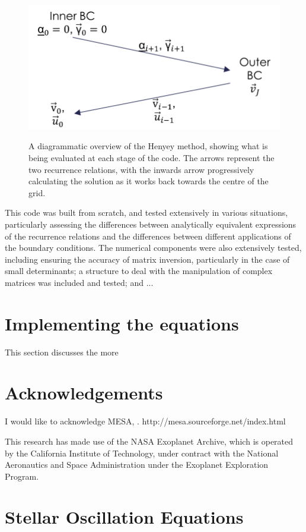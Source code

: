 \documentclass[11pt]{amsart}
\begin{document}
\begin{figure}
\begin{center}
\label{fig:overview}
\includegraphics[width = 0.5 \textwidth]{Overview.png}
\caption{A diagrammatic overview of the Henyey method, showing what is being evaluated at each stage of the code.  The arrows represent the two recurrence relations, with the inwards arrow progressively calculating the solution as it works back towards the centre of the grid.}
\end{center}
\end{figure}


This code was built from scratch, and tested extensively in various situations, particularly assessing the differences between analytically equivalent expressions of the recurrence relations and the differences between different applications of the boundary conditions.  The numerical components were also extensively tested, including ensuring the accuracy of matrix inversion, particularly in the case of small determinants; a structure to deal with the manipulation of complex matrices was included and tested; and ...







\section{Implementing the equations}

This section discusses the more 














\section{Acknowledgements}

I would like to acknowledge MESA, \cite{Paxton2011}. http://mesa.sourceforge.net/index.html

This research has made use of the NASA Exoplanet Archive, which is operated by the California Institute of Technology, under contract with the National Aeronautics and Space Administration under the Exoplanet Exploration Program.
















\newpage

\appendix

\section{Stellar Oscillation Equations} \label{ap:Osc}
\end{document}
